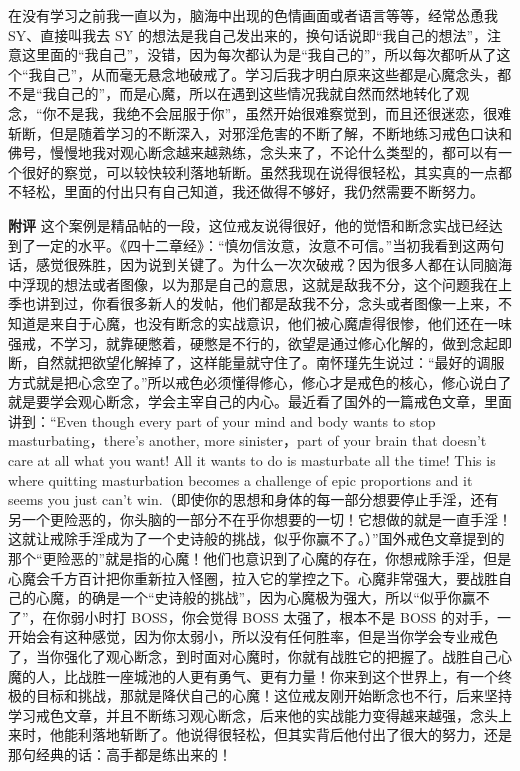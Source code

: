 \begin{case}
    在没有学习之前我一直以为，脑海中出现的色情画面或者语言等等，经常怂恿我 SY、直接叫我去 SY 的想法是我自己发出来的，换句话说即“我自己的想法”，注意这里面的“我自己”，没错，因为每次都认为是“我自己的”，所以每次都听从了这个“我自己”，从而毫无悬念地破戒了。学习后我才明白原来这些都是心魔念头，都不是“我自己的”，而是心魔，所以在遇到这些情况我就自然而然地转化了观念，“你不是我，我绝不会屈服于你”，虽然开始很难察觉到，而且还很迷恋，很难斩断，但是随着学习的不断深入，对邪淫危害的不断了解，不断地练习戒色口诀和佛号，慢慢地我对观心断念越来越熟练，念头来了，不论什么类型的，都可以有一个很好的察觉，可以较快较利落地斩断。虽然我现在说得很轻松，其实真的一点都不轻松，里面的付出只有自己知道，我还做得不够好，我仍然需要不断努力。

    \textbf{附评} 这个案例是精品帖的一段，这位戒友说得很好，他的觉悟和断念实战已经达到了一定的水平。《四十二章经》：“慎勿信汝意，汝意不可信。”当初我看到这两句话，感觉很殊胜，因为说到关键了。为什么一次次破戒？因为很多人都在认同脑海中浮现的想法或者图像，以为那是自己的意思，这就是敌我不分，这个问题我在上季也讲到过，你看很多新人的发帖，他们都是敌我不分，念头或者图像一上来，不知道是来自于心魔，也没有断念的实战意识，他们被心魔虐得很惨，他们还在一味强戒，不学习，就靠硬憋着，硬憋是不行的，欲望是通过修心化解的，做到念起即断，自然就把欲望化解掉了，这样能量就守住了。南怀瑾先生说过：“最好的调服方式就是把心念空了。”所以戒色必须懂得修心，修心才是戒色的核心，修心说白了就是要学会观心断念，学会主宰自己的内心。最近看了国外的一篇戒色文章，里面讲到：“Even though every part of your mind and body wants to stop masturbating，there's another, more sinister，part of your brain that doesn't care at all what you want! All it wants to do is masturbate all the time! This is where quitting masturbation becomes a challenge of epic proportions and it seems you just can't win.（即使你的思想和身体的每一部分想要停止手淫，还有另一个更险恶的，你头脑的一部分不在乎你想要的一切！它想做的就是一直手淫！这就让戒除手淫成为了一个史诗般的挑战，似乎你赢不了。）”国外戒色文章提到的那个“更险恶的”就是指的心魔！他们也意识到了心魔的存在，你想戒除手淫，但是心魔会千方百计把你重新拉入怪圈，拉入它的掌控之下。心魔非常强大，要战胜自己的心魔，的确是一个“史诗般的挑战”，因为心魔极为强大，所以“似乎你赢不了”，在你弱小时打 BOSS，你会觉得 BOSS 太强了，根本不是 BOSS 的对手，一开始会有这种感觉，因为你太弱小，所以没有任何胜率，但是当你学会专业戒色了，当你强化了观心断念，到时面对心魔时，你就有战胜它的把握了。战胜自己心魔的人，比战胜一座城池的人更有勇气、更有力量！你来到这个世界上，有一个终极的目标和挑战，那就是降伏自己的心魔！这位戒友刚开始断念也不行，后来坚持学习戒色文章，并且不断练习观心断念，后来他的实战能力变得越来越强，念头上来时，他能利落地斩断了。他说得很轻松，但其实背后他付出了很大的努力，还是那句经典的话：高手都是练出来的！
\end{case}

